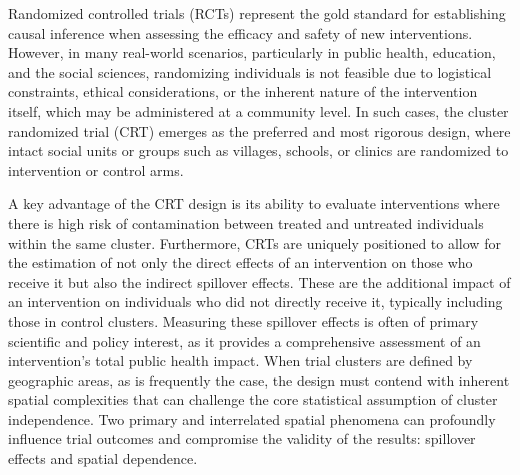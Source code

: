 \documentclass{article}[11pt]
\begin{document}
Randomized controlled trials (RCTs) represent the gold standard for establishing causal inference when assessing the efficacy and safety of new interventions\cite{pocock_clinical_1983}\cite{smith_field_2015}. However, in many real-world scenarios, particularly in public health, education, and the social sciences, randomizing individuals is not feasible due to logistical constraints, ethical considerations, or the inherent nature of the intervention itself, which may be administered at a community level. In such cases, the cluster randomized trial (CRT) emerges as the preferred and most rigorous design, where intact social units or groups such as villages, schools, or clinics are randomized to intervention or control arms\cite{hayes_cluster_2017}\cite{donner_design_2000}.

A key advantage of the CRT design is its ability to evaluate interventions where there is high risk of contamination between treated and untreated individuals within the same cluster\cite{hayes_cluster_2017}\cite{hudgens_toward_2008}. Furthermore, CRTs are uniquely positioned to allow for the estimation of not only the direct effects of an intervention on those who receive it but also the indirect spillover effects. These are the additional impact of an intervention on individuals who did not directly receive it, typically including those in control clusters. Measuring these spillover effects is often of primary scientific and policy interest, as it provides a comprehensive assessment of an intervention's total public health impact\cite{hayes_cluster_2017}\cite{hayes_design_2000}. When trial clusters are defined by geographic areas, as is frequently the case, the design must contend with inherent spatial complexities that can challenge the core statistical assumption of cluster independence. Two primary and interrelated spatial phenomena can profoundly influence trial outcomes and compromise the validity of the results: spillover effects and spatial dependence\cite{hayes_cluster_2017}\cite{smith_field_2015}.
\end{document}
